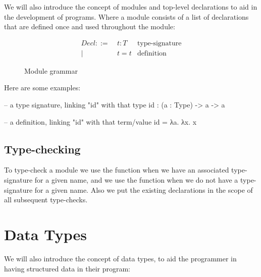We will also introduce the concept of modules and top-level declarations to aid in the development of programs. Where a module consists of a list of declarations that are defined once and used throughout the module:

\begin{figure}[H]
       \[
              \begin{aligned}
                     Decl ::= & \ t : T & \text{type-signature} \\
                     |        & \ t = t & \text{definition}
              \end{aligned}
       \]
       \caption{Module grammar}
\end{figure}


Here are some examples:

\begin{piforall}
-- a type signature, linking "id" with that type
id : (a : Type) -> a -> a

-- a definition, linking "id" with that term/value
id = λa. λx. x
\end{piforall}

\subsection{Type-checking}

To type-check a module we use the  function when we have an associated type-signature for a given name, and we use the  function when we do not have a type-signature for a given name. Also we put the existing declarations in the scope of all subsequent type-checks.

\section{Data Types}

We will also introduce the concept of data types, to aid the programmer in having structured data in their program:

